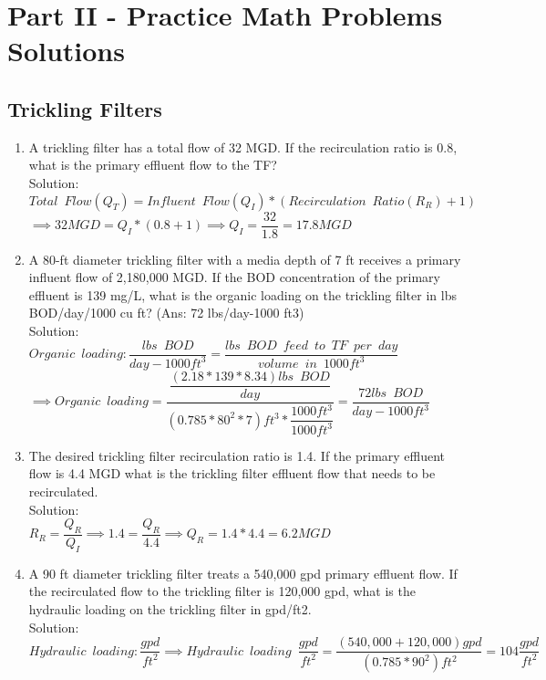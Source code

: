 
\chapter{Part II - Practice Math Problems Solutions}

\section{Trickling Filters}
\begin{enumerate}

\item A trickling filter has a total flow of 32 MGD.  If the recirculation ratio is 0.8, what is the primary effluent flow to the TF?\\
Solution:\\
$Total \enspace Flow (Q_T) = Influent \enspace Flow (Q_I)*(Recirculation \enspace Ratio(R_R) +1)$\\
$\implies 32 MGD=Q_I*(0.8+1)\implies Q_I=\dfrac{32}{1.8}=\boxed{17.8 MGD}$

\item A 80-ft diameter trickling filter with a media depth of 7 ft receives a primary influent flow of 2,180,000 MGD. If the BOD concentration of the primary effluent is 139 mg/L, what is the organic loading on the trickling filter in lbs BOD/day/1000 cu ft? (Ans: 72 lbs/day-1000 ft3)\\
Solution:\\
$Organic \enspace loading:\dfrac{lbs \enspace BOD}{day-1000ft^3}=\dfrac{lbs \enspace BOD \enspace feed \enspace to \enspace TF \enspace per \enspace day}{volume \enspace in \enspace 1000ft^3}$\\
\vspace{0.3cm}
$\implies Organic \enspace loading=\dfrac{\dfrac{(2.18*139*8.34)lbs \enspace BOD}{day}}{(0.785*80^2*7)ft^3*\dfrac{1000ft^3}{1000ft^3}}=\boxed{\dfrac{72 lbs \enspace BOD}{day-1000 ft^3}}$

\item The desired trickling filter recirculation ratio is 1.4.  If the primary effluent flow is 4.4 MGD what is the trickling filter effluent flow that needs to be recirculated.\\
Solution:\\
$R_R=\dfrac{Q_R}{Q_I}\implies 1.4=\dfrac{Q_R}{4.4}\implies Q_R =1.4*4.4=\boxed{6.2 MGD}$\\

\item A 90 ft diameter trickling filter treats a 540,000 gpd primary effluent flow. If the recirculated flow to the trickling filter is 120,000 gpd, what is the hydraulic loading on the trickling filter in gpd/ft2.\\
Solution:\\
$Hydraulic \enspace loading:\dfrac{gpd}{ft^2} \implies Hydraulic \enspace loading \enspace \dfrac{gpd}{ft^2}=\dfrac{(540,000+120,000)gpd}{(0.785*90^2)ft^2} =\boxed{104\dfrac{gpd}{ft^2}}$

\end{enumerate}

